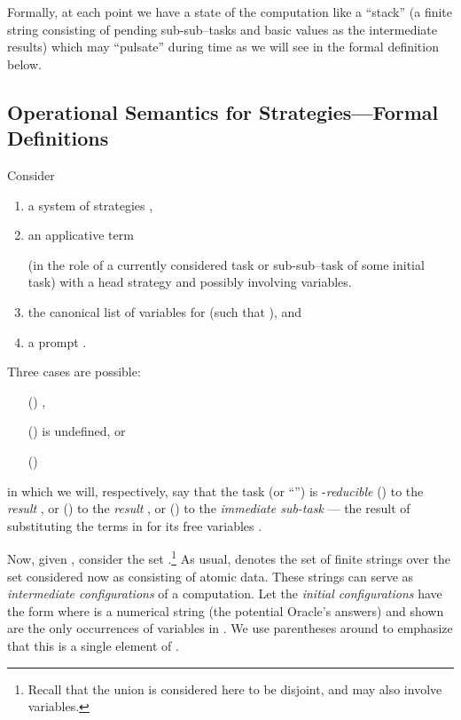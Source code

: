 \documentclass[fleqn]{LMCS}
\theoremstyle{plain}\newtheorem{satz}[thm]{Satz}
\theoremstyle{plain}\newtheorem{hyp}[thm]{Hypothesis}
\theoremstyle{plain}\newtheorem{hyps}[thm]{Hypotheses}
\theoremstyle{definition}\newtheorem{note}[thm]{Note}
\newcommand{\?}{\mbox{?}}
\begin{document}
Formally, at each point 
we have a state of the computation 
like a ``stack'' (a finite string 
consisting of pending 
sub-sub--tasks and basic values as the intermediate results) 
which may ``pulsate'' during time as we will see in the formal 
definition below. 


\subsection{Operational Semantics for Strategies---Formal Definitions}
\label{sec:operational-sem-formal}

\noindent
Consider 
\begin{enumerate}[]
\item
a system of strategies , 
\item
an applicative term 
 
(in the role of a currently considered task or sub-sub--task 
of some initial task) 
with a head strategy  and possibly involving variables. 
\item
the canonical list of variables  for  (such that 
), and 
\item
a prompt .
\end{enumerate}
Three cases are possible: 
\begin{enumerate}[(1)]
\item[()]
, 
\item[()]
 is undefined, or 
\item[()]
 
\end{enumerate}
in which we will, respectively, say that the task 
 (or ``'') 
is -\emph{reducible} () to the \emph{result} , 
or 
() to the \emph{result} , 
or
() to 
the \emph{immediate sub-task} 
 --- the result of substituting the terms 
 in   
 for 
its free variables . 

Now, given , consider the set 
.\footnote{Recall that the union is considered here to be disjoint, and 
 may also involve variables. 
}
As usual,  denotes the set of finite strings over 
the set  considered now as consisting of atomic data. These strings 
can serve as \emph{intermediate configurations} of a computation. 
Let the \emph{initial configurations} have the form  
where  is a numerical string (the potential Oracle's answers) 
and  shown are the only occurrences of 
variables in . 
We use parentheses around  
to emphasize that this is a single element of . 
\end{document}
